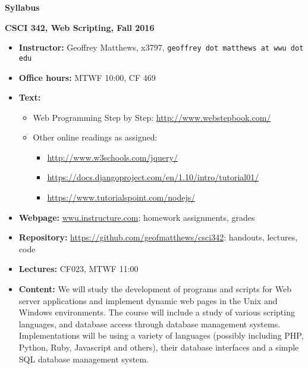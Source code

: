 \documentclass{article}
\begin{document}
\centerline{\large \bf Syllabus}

\centerline{\bf CSCI 342, Web Scripting, Fall 2016}

\begin{itemize}

\item
{\bf Instructor:} Geoffrey Matthews, x3797, {\tt  geoffrey dot matthews at wwu dot edu}
\item
{\bf Office hours:} MTWF 10:00, CF 469
\item
{\bf Text:} \begin{itemize}\item
Web Programming Step by Step: \url{http://www.webstepbook.com/}
\item
  Other online readings as assigned:
  \begin{itemize}
  \item \url{http://www.w3schools.com/jquery/}
  \item \url{https://docs.djangoproject.com/en/1.10/intro/tutorial01/}
  \item \url{https://www.tutorialspoint.com/nodejs/}
  \end{itemize}
\end{itemize}
\item {\bf Webpage:}  \url{wwu.instructure.com}:  homework assignments, grades
\item {\bf Repository:} \url{https://github.com/geofmatthews/csci342}:  handouts, lectures, code
\item
{\bf Lectures:} 
CF023, MTWF 11:00

\item
{\bf Content:} We will study the development of programs and scripts
for Web server applications and implement dynamic web pages in the
Unix and Windows environments.  The course will include a study of
various scripting languages, and database access through database
management systems.  Implementations will be using a variety of
languages (possibly including PHP, Python, Ruby, Javascript and
others), their database interfaces and a simple SQL database
management system.


\end{itemize}
\end{document}

